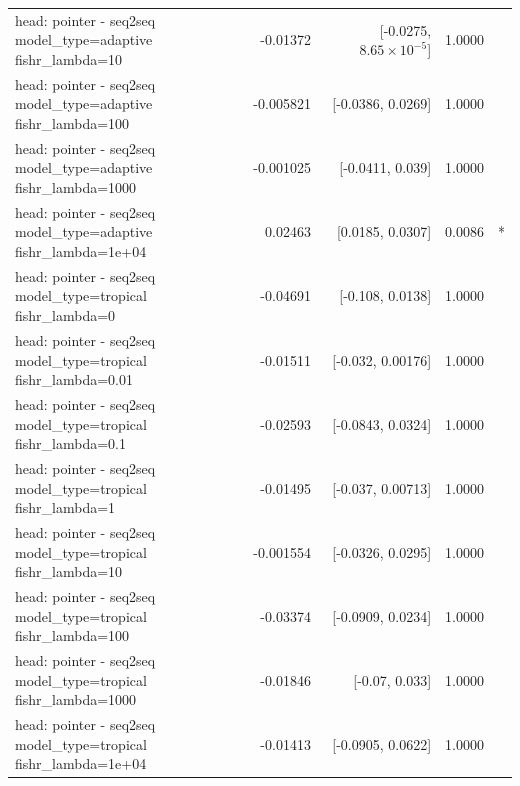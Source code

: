 \documentclass[10pt]{article}
\makeatletter
\newcommand{\stackcell}[1]{\begin{tabular}[t]{@{}l@{}}#1\end{tabular}}
\makeatother
\begin{document}
{\begin{longtable}{lrrrl}
\stackcell{head: pointer - seq2seq\\\footnotesize model\_type=adaptive fishr\_lambda=10 } & -0.01372 & [-0.0275, $8.65\times10^{-5}$] & 1.0000 & \\
\stackcell{head: pointer - seq2seq\\\footnotesize model\_type=adaptive fishr\_lambda=100 } & -0.005821 & [-0.0386, 0.0269] & 1.0000 & \\
\stackcell{head: pointer - seq2seq\\\footnotesize model\_type=adaptive fishr\_lambda=1000 } & -0.001025 & [-0.0411, 0.039] & 1.0000 & \\
\stackcell{head: pointer - seq2seq\\\footnotesize model\_type=adaptive fishr\_lambda=1e+04 } & 0.02463 & [0.0185, 0.0307] & 0.0086 & *\\
\stackcell{head: pointer - seq2seq\\\footnotesize model\_type=tropical fishr\_lambda=0 } & -0.04691 & [-0.108, 0.0138] & 1.0000 & \\
\stackcell{head: pointer - seq2seq\\\footnotesize model\_type=tropical fishr\_lambda=0.01 } & -0.01511 & [-0.032, 0.00176] & 1.0000 & \\
\stackcell{head: pointer - seq2seq\\\footnotesize model\_type=tropical fishr\_lambda=0.1 } & -0.02593 & [-0.0843, 0.0324] & 1.0000 & \\
\stackcell{head: pointer - seq2seq\\\footnotesize model\_type=tropical fishr\_lambda=1 } & -0.01495 & [-0.037, 0.00713] & 1.0000 & \\
\stackcell{head: pointer - seq2seq\\\footnotesize model\_type=tropical fishr\_lambda=10 } & -0.001554 & [-0.0326, 0.0295] & 1.0000 & \\
\stackcell{head: pointer - seq2seq\\\footnotesize model\_type=tropical fishr\_lambda=100 } & -0.03374 & [-0.0909, 0.0234] & 1.0000 & \\
\stackcell{head: pointer - seq2seq\\\footnotesize model\_type=tropical fishr\_lambda=1000 } & -0.01846 & [-0.07, 0.033] & 1.0000 & \\
\stackcell{head: pointer - seq2seq\\\footnotesize model\_type=tropical fishr\_lambda=1e+04 } & -0.01413 & [-0.0905, 0.0622] & 1.0000 & \\

\end{longtable}}
\end{document}
